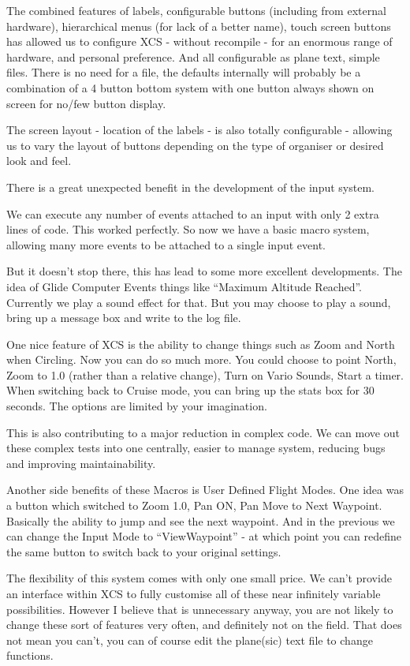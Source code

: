 The combined features of labels, configurable buttons (including from
external hardware), hierarchical menus (for lack of a better name),
touch screen buttons has allowed us to configure XCS - without
recompile - for an enormous range of hardware, and personal
preference.  And all configurable as plane text, simple files. There
is no need for a file, the defaults internally will probably be a
combination of a 4 button bottom system with one button always shown
on screen for no/few button display.

The screen layout - location of the labels - is also totally
configurable - allowing us to vary the layout of buttons depending on
the type of organiser or desired look and feel.

There is a great unexpected benefit in the development of the input
system.

We can execute any number of events attached to an input with only 2
extra lines of code. This worked perfectly. So now we have a basic
macro system, allowing many more events to be attached to a single
input event.

But it doesn't stop there, this has lead to some more excellent
developments. The idea of Glide Computer Events things like ``Maximum
Altitude Reached''. Currently we play a sound effect for that. But you
may choose to play a sound, bring up a message box and write to the
log file.

One nice feature of XCS is the ability to change things such as Zoom
and North when Circling. Now you can do so much more. You could choose
to point North, Zoom to 1.0 (rather than a relative change), Turn on
Vario Sounds, Start a timer. When switching back to Cruise mode, you
can bring up the stats box for 30 seconds. The options are limited by
your imagination.

This is also contributing to a major reduction in complex code. We can
move out these complex tests into one centrally, easier to manage
system, reducing bugs and improving maintainability.

Another side benefits of these Macros is User Defined Flight
Modes. One idea was a button which switched to Zoom 1.0, Pan ON, Pan
Move to Next Waypoint. Basically the ability to jump and see the next
waypoint. And in the previous we can change the Input Mode to
``ViewWaypoint'' - at which point you can redefine the same button to
switch back to your original settings.

The flexibility of this system comes with only one small price. We
can't provide an interface within XCS to fully customise all of these
near infinitely variable possibilities. However I believe that is
unnecessary anyway, you are not likely to change these sort of
features very often, and definitely not on the field. That does not
mean you can't, you can of course edit the plane(sic) text file to
change functions.

